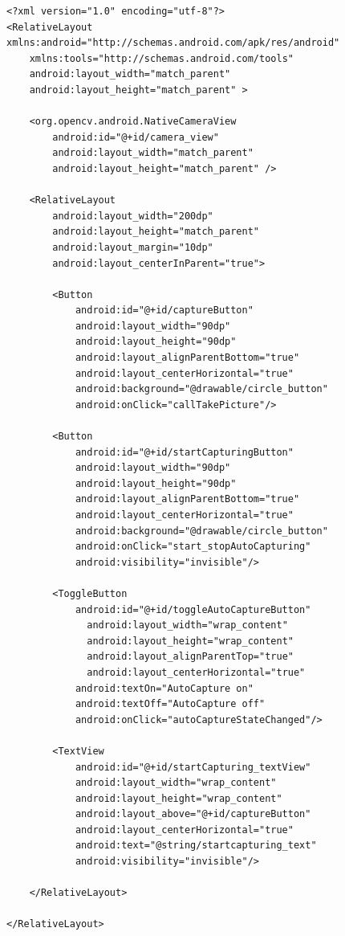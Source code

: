\begin{lstlisting}
<?xml version="1.0" encoding="utf-8"?>
<RelativeLayout xmlns:android="http://schemas.android.com/apk/res/android"
    xmlns:tools="http://schemas.android.com/tools"
    android:layout_width="match_parent"
    android:layout_height="match_parent" >

    <org.opencv.android.NativeCameraView
        android:id="@+id/camera_view"
        android:layout_width="match_parent"
        android:layout_height="match_parent" />
    
    <RelativeLayout
	    android:layout_width="200dp"
	    android:layout_height="match_parent"
	    android:layout_margin="10dp"
	    android:layout_centerInParent="true">
	    
        <Button
	        android:id="@+id/captureButton"
	        android:layout_width="90dp"
	        android:layout_height="90dp"
	        android:layout_alignParentBottom="true"
	        android:layout_centerHorizontal="true"
	        android:background="@drawable/circle_button"
	        android:onClick="callTakePicture"/>
        
        <Button
	        android:id="@+id/startCapturingButton"
	        android:layout_width="90dp"
	        android:layout_height="90dp"
	        android:layout_alignParentBottom="true"
	        android:layout_centerHorizontal="true"
	        android:background="@drawable/circle_button"
	        android:onClick="start_stopAutoCapturing"
	        android:visibility="invisible"/>
	          
	    <ToggleButton
	        android:id="@+id/toggleAutoCaptureButton"
              android:layout_width="wrap_content" 
              android:layout_height="wrap_content" 
              android:layout_alignParentTop="true"
              android:layout_centerHorizontal="true"
	        android:textOn="AutoCapture on"
	        android:textOff="AutoCapture off"	    
	        android:onClick="autoCaptureStateChanged"/>

	    <TextView
	        android:id="@+id/startCapturing_textView"
	        android:layout_width="wrap_content"
	        android:layout_height="wrap_content"
	        android:layout_above="@+id/captureButton"
	        android:layout_centerHorizontal="true"
	        android:text="@string/startcapturing_text"
	        android:visibility="invisible"/>

	</RelativeLayout>
	
</RelativeLayout>

\end{lstlisting}

